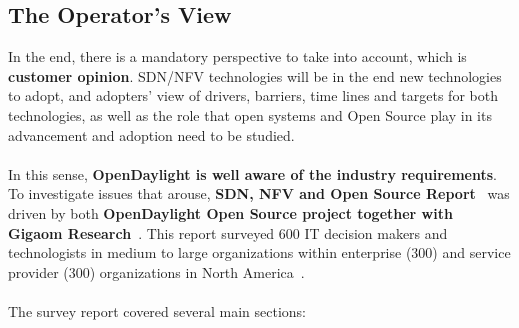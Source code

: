 \documentclass[a4paper, 12pt]{book}
\begin{document}
\subsection{The Operator's View}
In the end, there is a mandatory perspective to take into account, which is \textbf{customer opinion}. SDN/NFV technologies will be in the end new technologies to adopt, and adopters' view of drivers, barriers, time lines and targets for both technologies, as well as the role that open systems and Open Source play in its advancement and adoption need to be studied.\\
\\
In this sense, \textbf{OpenDaylight is well aware of the industry requirements}. To investigate issues that arouse, \textbf{SDN, NFV and Open Source Report}~\cite{SDNandNFVOperatorsView} was driven by both \textbf{OpenDaylight Open Source project together with Gigaom Research}~\cite{GigaomResearch}. This report surveyed 600 IT decision makers and technologists in medium to large organizations within enterprise (300) and service provider (300) organizations in North America~\cite{SDNandNFVOperatorsView}.\\
\\
The survey report covered several main sections:
\end{document}
